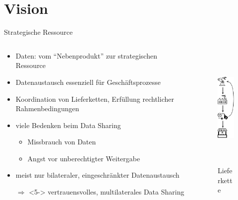
\section{Vision}


\begin{frame}{Strategische Ressource {\footnotesize\cite{mollerIndustrialDataEcosystems2024}}}
    \begin{columns}
        \begin{column}{0.7\textwidth}
            \begin{itemize}
                \item Daten: vom \enquote{Nebenprodukt} zur strategischen Ressource
                \item Datenaustausch essenziell für Geschäftsprozesse
                \item Koordination von Lieferketten, Erfüllung rechtlicher Rahmenbedingungen
                
                \item<2-> viele Bedenken beim Data Sharing
                \begin{itemize}
                    \item<2-> Missbrauch von Daten
                    \item<3-> Angst vor unberechtigter Weitergabe %
                \end{itemize}
                
                \item<4-> meist nur bilateraler, eingeschränkter Datenaustausch
                
                \item[$\Rightarrow$]<5-> vertrauensvolles, multilaterales Data Sharing
            \end{itemize}
        \end{column}

        \begin{column}{0.3\textwidth}
            \begin{figure}
                \centering
                \includegraphics[height=6cm]{./assets/supply_chain.drawio.pdf}
                \caption{Lieferkette}
            \end{figure}
        \end{column}
    \end{columns}
\end{frame}



